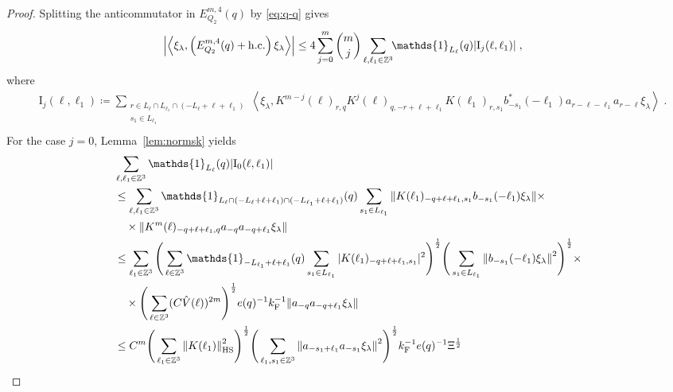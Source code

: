 \documentclass[12pt,a4paper]{article}
\numberwithin{equation}{section}
\newcommand{\1}{\mathbb{I}}
\newcommand{\F}{\mathrm{F}}
\newcommand{\HS}{\mathrm{HS}}
\newcommand{\I}{\mathrm{I}}
\newcommand{\kF}{k_\F}
\newcommand{\Zstar}{\mathbb{Z}^3} %
\newcommand{\Z}{\mathbb{Z}}
\newcommand{\half}{\frac{1}{2}}
\newcommand{\eva}[1]{\left\langle #1 \right\rangle}
\theoremstyle{plain}
\theoremstyle{definition}
\theoremstyle{remark}
\theoremstyle{plain}
\theoremstyle{definition}
\theoremstyle{remark}
\begin{document}
\begin{proof}
Splitting the anticommutator in $ E^{m,4}_{Q_2}(q) $ by \eqref{eq:q-q} gives
\begin{equation} \label{eq:EQ2171}
\begin{aligned}
	& \abs{\eva{\xi_\lambda,\left(E^{m,4}_{Q_2}(q) + \mathrm{h.c.}\right) \xi_\lambda }}
	\le 4 \sum_{j=0}^m {{m}\choose j} \sum_{\ell,\ell_1 \in \Zstar}\!\! \mathds{1}_{L_\ell}(q) |\I_j(\ell, \ell_1)| \;,
	\end{aligned}
\end{equation}
where
\begin{equation}
\begin{aligned}
	& \I_j(\ell, \ell_1)
	\coloneq \sum_{\substack{r\in L_{\ell} \cap L_{\ell_1} \cap (-L_{\ell}+\ell+\ell_1)\\ s_1 \in L_{\ell_1}}} \!\!
		\eva{\xi_\lambda, K^{m-j}(\ell)_{r,q} K^{j}(\ell)_{q,-r+\ell+\ell_1} K(\ell_1)_{r,s_1} b^*_{-s_1}(-\ell_1) a_{r-\ell-\ell_1} a_{r-\ell} \xi_\lambda} \;. \\
\end{aligned}
\end{equation}
For the case $ j = 0 $, Lemma~\ref{lem:normsk} yields
\begin{align}
	&\sum_{\ell,\ell_1 \in \Zstar} \mathds{1}_{L_\ell}(q) |\I_0(\ell, \ell_1)| \nonumber\\
	&\leq \sum_{\ell,\ell_1 \in \Zstar} \mathds{1}_{L_\ell \cap (-L_\ell + \ell + \ell_1) \cap (-L_{\ell_1} + \ell + \ell_1)}(q) \sum\limits_{s_1 \in L_{\ell_1}}
		\norm{K(\ell_1)_{-q+\ell+\ell_1,s_1} b_{-s_1}(-\ell_1)  \xi_\lambda} \times \nonumber\\
	&\quad \times \norm{ K^m(\ell)_{-q+\ell+\ell_1,q}a_{-q}a_{-q+\ell_1}  \xi_\lambda } \nonumber\\
	&\leq \sum_{\ell_1 \in \Zstar}
		\Bigg( \sum_{\ell \in \Zstar} \mathds{1}_{-L_{\ell_1} + \ell + \ell_1}(q) \sum\limits_{s_1 \in L_{\ell_1}} |K(\ell_1)_{-q+\ell+\ell_1,s_1}|^2 \Bigg)^{\half}
		\Bigg( \sum\limits_{s_1 \in L_{\ell_1}} \norm{ b_{-s_1}(-\ell_1)  \xi_\lambda}^2 \Bigg)^{\half} \times \nonumber\\
	&\quad \times \Bigg( \sum_{\ell \in \Zstar} (C \hat{V}(\ell))^{2m} \Bigg)^{\half}
		e(q)^{-1} \kF^{-1}
		\norm{a_{-q}a_{-q+\ell_1}  \xi_\lambda } \nonumber\\
	&\leq C^m \Bigg( \sum_{\ell_1 \in \Zstar}
		\norm{K(\ell_1)}_{\HS}^2 \Bigg)^{\half}
		\Bigg( \sum_{\ell_1,s_1 \in \Z^3} \norm{a_{-s_1+\ell_1} a_{-s_1} \xi_\lambda}^2 \Bigg)^{\frac 12}
		\kF^{-1} e(q)^{-1} \Xi^\half \nonumber\\

\end{align}
\end{proof}
\end{document}
